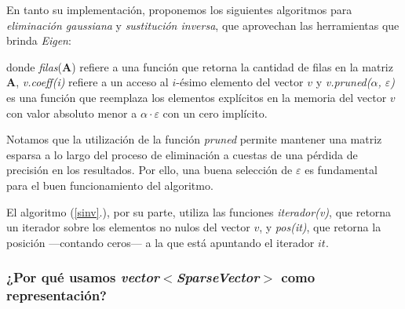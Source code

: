 \vspace{1em}
En tanto su implementación, proponemos los siguientes algoritmos para \textit{eliminación gaussiana} y \textit{sustitución inversa}, que aprovechan las herramientas que brinda \textit{Eigen}:

\vspace{1em}


\vspace{1em}
\noindent donde \textit{filas}(\textbf{A}) refiere a una función que retorna la cantidad de filas en la matriz \textbf{A}, \textit{v.coeff(i)} refiere a un acceso al $i$-ésimo elemento del vector $v$ y \textit{v.pruned($\alpha$, $\varepsilon$)} es una función que reemplaza los elementos explícitos en la memoria del vector $v$ con valor absoluto menor a $\alpha \cdot \varepsilon$ con un cero implícito.

\vspace{1em}
Notamos que la utilización de la función \textit{pruned} permite mantener una matriz esparsa a lo largo del proceso de eliminación a cuestas de una pérdida de precisión en los resultados. Por ello, una buena selección de $\varepsilon$ es fundamental para el buen funcionamiento del algoritmo. 

\vspace{1em}
\noindent %

\vspace{1em}


\vspace{1em}
El algoritmo (\ref{sinv}.), por su parte, utiliza las funciones \textit{iterador(v)}, que retorna un iterador sobre los elementos no nulos del vector $v$, y \textit{pos(it)}, que retorna la posición ---contando ceros--- a la que está apuntando el iterador $it$. 




\vspace{2em}
\subsubsection{¿Por qué usamos \textit{vector$<$SparseVector$>$} como representación?}\label{representacion}

